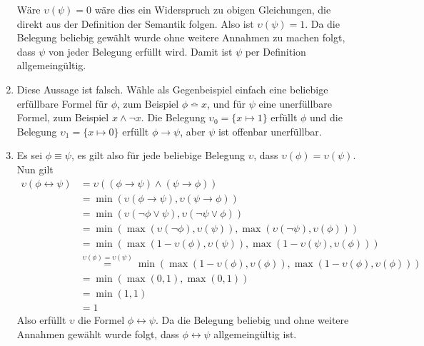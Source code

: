 \documentclass[a4paper,10pt]{article}
\begin{document}
\begin{enumerate}
Wäre $\upsilon(\psi) = 0$ wäre dies ein Widerspruch zu obigen Gleichungen, die direkt aus der Definition der Semantik folgen. Also ist $\upsilon(\psi) = 1$. Da die Belegung beliebig gewählt wurde ohne weitere Annahmen zu machen folgt, dass $\psi$ von jeder Belegung erfüllt wird. Damit ist $\psi$ per Definition allgemeingültig.
\item Diese Aussage ist falsch. Wähle als Gegenbeispiel einfach eine beliebige erfüllbare Formel für $\phi$, zum Beispiel $\phi \bumpeq x$, und für $\psi$ eine unerfüllbare Formel, zum Beispiel $x \wedge \neg x$. Die Belegung $\upsilon_0 = \{x \mapsto 1\}$ erfüllt $\phi$ und die Belegung $\upsilon_1 = \{x \mapsto 0\}$ erfüllt $\phi \rightarrow \psi$, aber $\psi$ ist offenbar unerfüllbar.

\item Es sei $\phi \equiv \psi$, es gilt also für jede beliebige Belegung $\upsilon$, dass $\upsilon(\phi) = \upsilon(\psi)$. Nun gilt
\begin{align*}
\upsilon(\phi \leftrightarrow \psi) & = \upsilon((\phi \rightarrow \psi) \wedge (\psi \rightarrow \phi)) \\
& = \min(\upsilon(\phi \rightarrow \psi), \upsilon(\psi \rightarrow \phi)) \\
& = \min(\upsilon(\neg\phi \vee \psi), \upsilon(\neg\psi \vee \phi)) \\
& = \min(\max(\upsilon(\neg\phi), \upsilon(\psi)), \max(\upsilon(\neg\psi), \upsilon(\phi))) \\
& = \min(\max(1 - \upsilon(\phi), \upsilon(\psi)), \max(1 - \upsilon(\psi), \upsilon(\phi))) \\
& \stackrel{\upsilon(\phi) = \upsilon(\psi)}{=} \min(\max(1 - \upsilon(\phi), \upsilon(\phi)), \max(1 - \upsilon(\phi), \upsilon(\phi))) \\
& = \min(\max(0, 1), \max(0, 1)) \\
& = \min(1, 1) \\
&= 1
\end{align*}
Also erfüllt $\upsilon$ die Formel $\phi \leftrightarrow \psi$. Da die Belegung beliebig und ohne weitere Annahmen gewählt wurde folgt, dass $\phi \leftrightarrow \psi$ allgemeingültig ist.
\end{enumerate}
\end{document}
